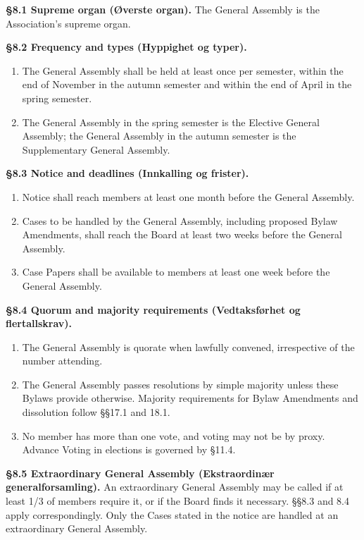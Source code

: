 \documentclass{../../../Common/Latex/Templates/rapport}
\begin{document}

\label{bylaw:8}
\textbf{\S 8.1 Supreme organ (Øverste organ).}\label{bylaw:8.1} The General Assembly is the Association's supreme organ.

\textbf{\S 8.2 Frequency and types (Hyppighet og typer).}\label{bylaw:8.2}
\begin{enumerate}
  \item The General Assembly shall be held at least once per semester, within the end of November in the autumn semester and within the end of April in the spring semester.
  \item The General Assembly in the spring semester is the Elective General Assembly; the General Assembly in the autumn semester is the Supplementary General Assembly.
\end{enumerate}

\textbf{\S 8.3 Notice and deadlines (Innkalling og frister).}\label{bylaw:8.3}
\begin{enumerate}
  \item Notice shall reach members at least one month before the General Assembly.
  \item Cases to be handled by the General Assembly, including proposed Bylaw Amendments, shall reach the Board at least two weeks before the General Assembly.
  \item Case Papers shall be available to members at least one week before the General Assembly.
\end{enumerate}

\textbf{\S 8.4 Quorum and majority requirements (Vedtaksførhet og flertallskrav).}\label{bylaw:8.4}
\begin{enumerate}
  \item The General Assembly is quorate when lawfully convened, irrespective of the number attending.
  \item The General Assembly passes resolutions by simple majority unless these Bylaws provide otherwise. Majority requirements for Bylaw Amendments and dissolution follow \S\S17.1 and 18.1.
  \item No member has more than one vote, and voting may not be by proxy. Advance Voting in elections is governed by \S11.4.
\end{enumerate}

\textbf{\S 8.5 Extraordinary General Assembly (Ekstraordinær generalforsamling).}\label{bylaw:8.5} An extraordinary General Assembly may be called if at least 1/3 of members require it, or if the Board finds it necessary. \S\S8.3 and 8.4 apply correspondingly. Only the Cases stated in the notice are handled at an extraordinary General Assembly.
\end{document}
